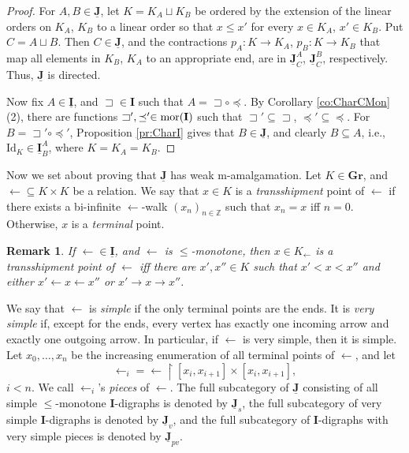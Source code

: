 \documentclass[12pt]{amsart}
\numberwithin{equation}{section}
\theoremstyle{plain}
\newtheorem{remark}[theorem]{\bf Remark}
\theoremstyle{definition}
\newcommand \Id{ \mbox{Id}}
\newcommand \sqsp{\sqsupset}
\newcommand \la{\leftarrow}
\newcommand \ra{\rightarrow}
\newcommand \mor{{\rm{mor}}}
\newcommand \GGRb{\mathbf{Gr}}
\newcommand \IIb{\mathbf{I}}
\newcommand \IIub{\underline{\mathbf{I}}}
\newcommand \JJub{\underline{\mathbf{J}}}
\newcommand \ZZ{\mathbb{Z}}
\begin{document}
\begin{proof}
For $A, B \in \JJub$, let $K=K_A \sqcup K_B$ be ordered by the extension of the linear orders on $K_A$, $K_B$ to a linear order so that  $x\leq x'$ for every $x \in K_A$, $x' \in K_B$. Put $C=A \sqcup B$. Then $C \in \JJub$, and the contractions $p_A:K \to K_A$, $p_B:K \to K_B$ that map all elements in $K_B$,  $K_A$ to an appropriate end, are in $\JJub^A_C$, $\JJub^B_C$, respectively.  Thus, $\JJub$ is directed.

Now fix $A \in \IIub$, and $\sqsp \in \IIb$ such that $A=\sqsp \circ \preceq$. By Corollary \ref{co:CharCMon}(2), there are functions $\sqsp', \preceq' \in \mor(\IIb)$ such that $\sqsp' \subseteq \sqsp$, $\preceq' \subseteq \preceq$. For $B=\sqsp' \circ \preceq'$, Proposition \ref{pr:CharI} gives that $B \in \JJub$, and clearly $B \subseteq A$, i.e., $\Id_K \in \IIub^A_B$, where $K=K_A=K_B$.

\end{proof}


Now we set about proving that $\JJub$ has weak m-amalgamation. Let $K \in \GGRb$, and $\leftarrow \subseteq K \times K$ be a relation. We say that $x \in K$ is a \emph{transshipment} point of $\la$ if there exists a bi-infinite $\la$-walk $(x_n)_{n \in \ZZ}$ such that $x_n=x$ iff $n=0$. Otherwise, $x$ is a \emph{terminal} point. %
%
\begin{remark}
If $\la \in \IIub$, and $\la$ is $\leq$-monotone, then $x \in K_\la$ is a transshipment point of $\la$ iff there are $x',x'' \in K$ such that $x' < x < x''$ and either $x' \leftarrow x \leftarrow x''$ or $x' \rightarrow x \rightarrow x''$.
\end{remark}
%
We say that $\leftarrow$ is \emph{simple} if the only terminal points are the ends. It is \emph{very simple} if, except for the ends, every vertex has exactly one incoming arrow and exactly one outgoing arrow. In particular, if $\la$ is very simple, then it is simple. 
Let $x_0, \ldots, x_n$ be the increasing enumeration of all terminal points of $\leftarrow$, and let $$\leftarrow_i=\leftarrow \upharpoonright [x_i,x_{i+1}] \times [x_i,x_{i+1}],$$  $i<n$. We call $\leftarrow_i$'s \emph{pieces} of $\la$. %
The full subcategory of $\JJub$ consisting of all simple $\leq$-monotone $\IIb$-digraphs is denoted by $\JJub_s$, the full subcategory of very simple $\IIb$-digraphs is denoted by $\JJub_v$, and the full subcategory of $\IIb$-digraphs with very simple pieces  is denoted by $\JJub_{pv}$.
\end{document}
